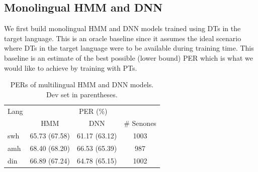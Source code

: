 \documentclass[a4paper]{article}
\begin{document}
\subsection{Monolingual HMM and DNN} \vspace{-1mm}
\label{sec:Monolingual HMM and DNN}
We first build monolingual HMM and DNN models trained using DTs in the target language. This is an oracle baseline since it assumes the ideal scenario where DTs in the target language were to be available during training time. This baseline is an estimate of the best possible (lower bound) PER which is what we would like to achieve by training with PTs.
%
\begin{table}[t!]
\centering %
\caption{PERs of multilingual HMM and DNN models. Dev set in parentheses.}
\begin{tabular}{l|c c c}
   \hline
Lang  & \multicolumn{3}{c}{PER (\%)} \\
          &  HMM & DNN & \# Senones   \\ \hline
swh      &65.73 (67.58)   &61.17 (63.12) & 1003 \\
amh      &68.40 (68.20)   &66.53 (65.39) &  987 \\
din     &66.89 (67.24)   &64.78 (65.15) & 1002  \\ \hline
\end{tabular}
\vspace{-5mm}
\label{Tab:PER_Mismatched_Multilingual}
\end{table}

\end{document}

